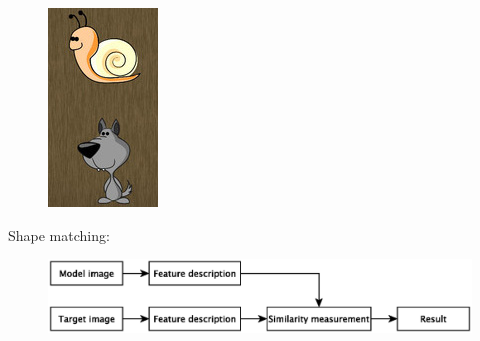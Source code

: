 \documentclass[notheorems,serif,table,compress]{beamer}  %
\begin{document}
\begin{frame}
\begin{figure}
\begin{minipage}[t]{0.2\linewidth}
              \includegraphics[width=0.6\linewidth]{match1}
              \end{minipage}
            \end{figure}
    \pause
    Shape matching:
    \begin{tcolorbox}[colback=red!5,colframe=blue!75!black]
        \begin{figure}
            \includegraphics[width=1\linewidth]{matchChart} 
        \end{figure}
    \end{tcolorbox}
\end{frame}
\end{document}
